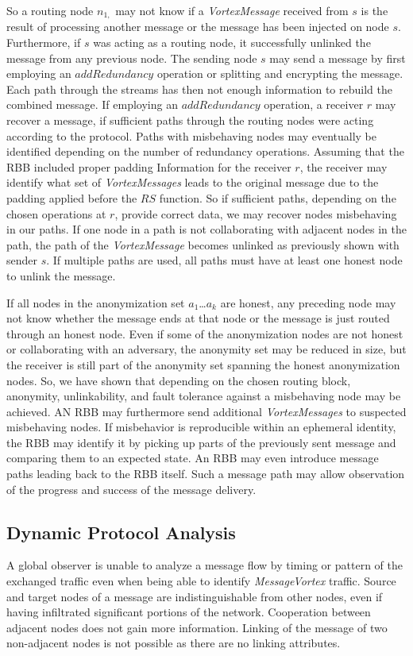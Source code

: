 \documentclass[acmsmall, screen]{acmart}
\begin{document}
So a routing node $n_{1,}$ may not know if a \emph{VortexMessage} received from $s$ is the result of processing another message or the message has been injected on node $s$. Furthermore, if $s$ was acting as a routing node, it successfully unlinked the message from any previous node. The sending node $s$ may send a message by first employing an $addRedundancy$ operation or splitting and encrypting the message. Each path through the streams has then not enough information to rebuild the combined message. If employing an $addRedundancy$ operation, a receiver $r$ may recover a message, if sufficient paths through the routing nodes were acting according to the protocol. Paths with misbehaving nodes may eventually be identified depending on the number of redundancy operations. Assuming that the RBB included proper padding Information for the receiver $r$, the receiver may identify what set of \emph{VortexMessages} leads to the original message due to the padding applied before the $RS$ function. So if sufficient paths, depending on the chosen operations at $r$, provide correct data, we may recover nodes misbehaving in our paths. If one node in a path is not collaborating with adjacent nodes in the path, the path of the \emph{VortexMessage} becomes unlinked as previously shown with sender $s$. If multiple paths are used, all paths must have at least one honest node to unlink the message. 

If all nodes in the anonymization set $a_1$\ldots$a_k$ are honest, any preceding node may not know whether the message ends at that node or the message is just routed through an honest node. Even if some of the anonymization nodes are not honest or collaborating with an adversary, the anonymity set may be reduced in size, but the receiver is still part of the anonymity set spanning the honest anonymization nodes. So, we have shown that depending on the chosen routing block, anonymity, unlinkability, and fault tolerance against a misbehaving node may be achieved. AN RBB may furthermore send additional \emph{VortexMessages} to suspected misbehaving nodes. If misbehavior is reproducible within an ephemeral identity, the RBB may identify it by picking up parts of the previously sent message and comparing them to an expected state. An RBB may even introduce message paths leading back to the RBB itself. Such a message path may allow observation of the progress and success of the message delivery.

\subsection{Dynamic Protocol Analysis\label{sec:dynamicAnalysis}}
A global observer is unable to analyze a message flow by timing or pattern of the exchanged traffic even when being able to identify \emph{MessageVortex} traffic. Source and target nodes of a message are indistinguishable from other nodes, even if having infiltrated significant portions of the network. Cooperation between adjacent nodes does not gain more information. Linking of the message of two non-adjacent nodes is not possible as there are no linking attributes.
\end{document}
